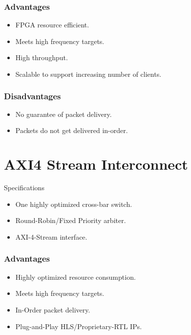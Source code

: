 \documentclass{beamer}
\begin{document}
	    \begin{frame}\frametitle{Advantages}
	    \pause
	    \begin{itemize}
	        \item FPGA resource efficient.
	        \pause
	        \item Meets high frequency targets.
	        \pause
	        \item High throughput.
	        \pause
	        \item Scalable to support increasing number of clients.
        \end{itemize}
	    \end{frame}	    
	    
	    \begin{frame}\frametitle{Disadvantages}
	    \pause
	    \begin{itemize}
	        \item No guarantee of packet delivery.
	        \pause
	        \item Packets do not get delivered in-order.
        \end{itemize}
	    \end{frame}		  
	    
	\section{AXI4 Stream Interconnect}
	    \begin{frame}{Specifications}
	    \pause
	    \begin{itemize}
	        \item One highly optimized cross-bar switch.
	        \pause
	        \item Round-Robin/Fixed Priority arbiter.
	        \pause
	        \item AXI-4-Stream interface.
	    \end{itemize}
	    \end{frame}
	    
	    \begin{frame}\frametitle{Advantages}
	    \pause
	    \begin{itemize}
	        \item Highly optimized resource consumption.
	        \pause
	        \item Meets high frequency targets.
	        \pause
	        \item In-Order packet delivery.
	        \pause
	        \item Plug-and-Play HLS/Proprietary-RTL IPs.
        \end{itemize}
	    \end{frame}	
	    
\end{document}
